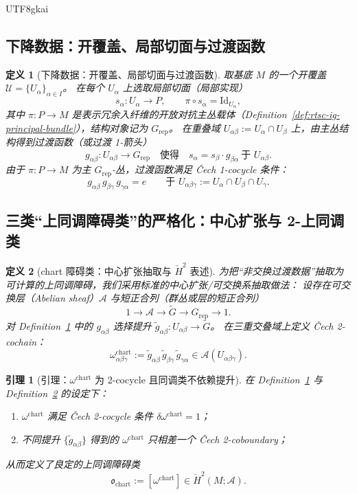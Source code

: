\documentclass[12pt]{article}
\newtheorem{definition}{定义}[section]
\newtheorem{lemma}{引理}[section]
\begin{document}
\begin{CJK*}{UTF8}{gkai}
\subsection{下降数据：开覆盖、局部切面与过渡函数}

\begin{definition}[下降数据：开覆盖、局部切面与过渡函数]
\label{def:appendix-descent-data}
取基底 $M$ 的一个开覆盖 $\mathcal{U}=\{U_\alpha\}_{\alpha\in I}$。
在每个 $U_\alpha$ 上选取局部切面（局部实现）
\[
s_\alpha:U_\alpha\to P,\qquad \pi\circ s_\alpha=\mathrm{Id}_{U_\alpha},
\]
其中 $\pi:P\to M$ 是表示冗余入纤维的开放对抗主丛载体（Definition~\ref{def:rtsc-ig-principal-bundle}），结构对象记为 $G_{\mathrm{rep}}$。
在重叠域 $U_{\alpha\beta}:=U_\alpha\cap U_\beta$ 上，由主丛结构得到过渡函数（或过渡 1-箭头）
\[
g_{\alpha\beta}:U_{\alpha\beta}\to G_{\mathrm{rep}}
\quad\text{使得}\quad
s_\alpha=s_\beta\cdot g_{\beta\alpha}\ \text{于 }U_{\alpha\beta}.
\]
由于 $\pi:P\to M$ 为主 $G_{\mathrm{rep}}$-丛，过渡函数满足 Čech 1-cocycle 条件：
\[
g_{\alpha\beta}\,g_{\beta\gamma}\,g_{\gamma\alpha}=e\qquad \text{于 }U_{\alpha\beta\gamma}:=U_\alpha\cap U_\beta\cap
  U_\gamma.
\]
\end{definition}

\subsection{三类“上同调障碍类”的严格化：中心扩张与 2-上同调类}

\begin{definition}[chart 障碍类：中心扩张抽取与 $\check H^2$ 表述]
\label{def:chart-obstruction-class}
为把“非交换过渡数据”抽取为可计算的上同调障碍，我们采用标准的中心扩张/可交换系抽取做法：
设存在可交换层（Abelian sheaf）$\mathcal{A}$ 与短正合列（群丛或层的短正合列）
\[
1\longrightarrow \mathcal{A}\longrightarrow \widetilde{G}\longrightarrow G_{\mathrm{rep}}\longrightarrow 1.
\]
对 Definition~\ref{def:appendix-descent-data} 中的 $g_{\alpha\beta}$ 选择提升
$\tilde g_{\alpha\beta}:U_{\alpha\beta}\to \widetilde{G}$。
在三重交叠域上定义 Čech 2-cochain：
\[
\omega^{\mathrm{chart}}_{\alpha\beta\gamma}
:=
\tilde g_{\alpha\beta}\,\tilde g_{\beta\gamma}\,\tilde g_{\gamma\alpha}
\in \mathcal{A}(U_{\alpha\beta\gamma}).
\]
\end{definition}

\begin{lemma}[引理：$\omega^{\mathrm{chart}}$ 为 2-cocycle 且同调类不依赖提升]
\label{lem:chart-omega-cocycle}
在 Definition~\ref{def:appendix-descent-data} 与 Definition~\ref{def:chart-obstruction-class} 的设定下：
\begin{enumerate}
  \item $\omega^{\mathrm{chart}}$ 满足 Čech 2-cocycle 条件 $\delta\omega^{\mathrm{chart}}=1$；
  \item 不同提升 $\{\tilde g_{\alpha\beta}\}$ 得到的 $\omega^{\mathrm{chart}}$ 只相差一个 Čech 2-coboundary；
\end{enumerate}
从而定义了良定的上同调障碍类
\[
\mathfrak{o}_{\mathrm{chart}}
:=
[\omega^{\mathrm{chart}}]\in \check{H}^2(M;\mathcal{A}).
\]
\end{lemma}


\end{CJK*}
\end{document}
